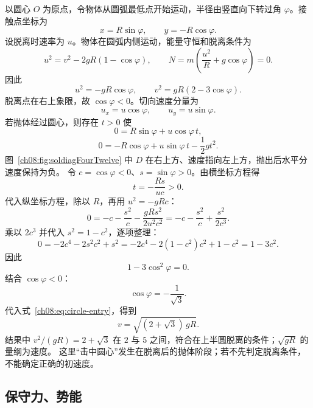 \begin{xesolution}
以圆心 $O$ 为原点，令物体从圆弧最低点开始运动，半径由竖直向下转过角
$\varphi$。接触点坐标为
\[
 x=R\sin\varphi,\qquad y=-R\cos\varphi.
\]
设脱离时速率为 $u$。物体在圆弧内侧运动，能量守恒和脱离条件为
\[
 u^2=v^2-2gR(1-\cos\varphi),
\qquad
 N=m\left(\frac{u^2}{R}+g\cos\varphi\right)=0.
\]
因此
\begin{equation}
 u^2=-gR\cos\varphi,\qquad v^2=gR(2-3\cos\varphi).
 \label{ch08:eq:circle-entry}
\end{equation}
脱离点在右上象限，故 $\cos\varphi<0$。切向速度分量为
\[
 u_x=u\cos\varphi,\qquad u_y=u\sin\varphi.
\]
若抛体经过圆心，则存在 $t>0$ 使
\[
 0=R\sin\varphi+u\cos\varphi\,t,
\]
\[
 0=-R\cos\varphi+u\sin\varphi\,t-\frac12gt^2.
\]
\soldiagFourTwelve
图~\ref{ch08:fig:soldiagFourTwelve} 中 $D$ 在右上方、速度指向左上方，抛出后水平分速度保持为负。
令 $c=\cos\varphi<0$、$s=\sin\varphi>0$。由横坐标方程得
\[
 t=-\frac{Rs}{uc}>0.
\]
代入纵坐标方程，除以 $R$，再用 $u^2=-gRc$：
\[
 0=-c-\frac{s^2}{c}-\frac{gRs^2}{2u^2c^2}
   =-c-\frac{s^2}{c}+\frac{s^2}{2c^3}.
\]
乘以 $2c^3$ 并代入 $s^2=1-c^2$，逐项整理：
\[
 0=-2c^4-2s^2c^2+s^2
 =-2c^4-2(1-c^2)c^2+1-c^2=1-3c^2.
\]
因此
\[
 1-3\cos^2\varphi=0.
\]
结合 $\cos\varphi<0$：
\[
 \cos\varphi=-\frac1{\sqrt3}.
\]
代入式~\eqref{ch08:eq:circle-entry}，得到
\[
 \boxed{v=\sqrt{(2+\sqrt3)\,gR}}.
\]
结果中 $v^2/(gR)=2+\sqrt3$ 在 $2$ 与 $5$ 之间，符合在上半圆脱离的条件；$\sqrt{gR}$ 的量纲为速度。
这里“击中圆心”发生在脱离后的抛体阶段；若不先判定脱离条件，不能确定正确的初速度。
\end{xesolution}

\subsection{保守力、势能}

